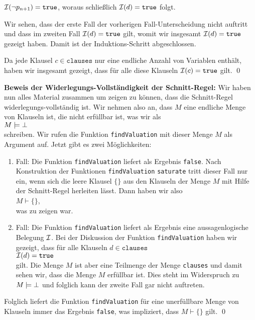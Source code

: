 \begin{enumerate}
\begin{enumerate}
\begin{enumerate}
                         $\mathcal{I}(\neg p_{n+1}) = \texttt{true}$, woraus schlie\ss{}lich $\mathcal{I}(d) = \texttt{true}$ folgt.
                   \end{enumerate}
                   Wir sehen, dass der erste Fall der vorherigen Fall-Unterscheidung nicht
                   auftritt und dass im zweiten Fall $\mathcal{I}(d) = \texttt{true}$ gilt, womit wir insgesamt 
                   $\mathcal{I}(d) = \texttt{true}$ gezeigt haben.  Damit ist der Induktions-Schritt
                   abgeschlossen.
             \end{enumerate}
             Da jede Klausel $c \in \texttt{clauses}$ nur eine endliche Anzahl von Variablen
             enth\"{a}lt, haben wir insgesamt gezeigt, dass f\"{u}r alle diese Klauseln 
             $\mathcal{I}(c) = \texttt{true}$ gilt. \qed
\end{enumerate}

\noindent
\textbf{Beweis der Widerlegungs-Vollst\"{a}ndigkeit der Schnitt-Regel:}
Wir haben nun alles Material zusammen um zeigen zu k\"{o}nnen, dass die Schnitt-Regel
widerlegungs-vollst\"{a}ndig ist.  Wir nehmen also an, dass $M$ eine endliche Menge von Klauseln ist,  die nicht
erf\"{u}llbar ist, was wir als
\\[0.2cm]
\hspace*{1.3cm}
$M \models \bot$ 
\\[0.2cm]
schreiben.  Wir rufen die Funktion \texttt{findValuation} mit dieser Menge $M$ als Argument auf.
Jetzt gibt es zwei M\"{o}glichkeiten:
\begin{enumerate}
\item Fall: Die Funktion \texttt{findValuation} liefert als Ergebnis \texttt{false}.  Nach
      Konstruktion der Funktionen \texttt{findValuation} \texttt{saturate} tritt dieser Fall nur
      ein, wenn sich die leere Klausel $\{\}$ aus den Klauseln der Menge $M$ mit Hilfe der
      Schnitt-Regel herleiten l\"{a}sst.  Dann haben wir also
      \\[0.2cm]
      \hspace*{1.3cm}
      $M \vdash \{\}$,
      \\[0.2cm]
      was zu zeigen war.
\item Fall: Die Funktion \texttt{findValuation} liefert als Ergebnis eine aussagenlogische Belegung
      $\mathcal{I}$.  Bei der Diskussion der Funktion \texttt{findValuation} haben wir gezeigt, dass f\"{u}r
      alle Klauseln $d \in \texttt{clauses}$
      \\[0.2cm]
      \hspace*{1.3cm}
      $\mathcal{I}(d) = \texttt{true}$
      \\[0.2cm]
      gilt.  Die Menge $M$ ist aber eine Teilmenge der Menge \texttt{clauses} und damit sehen wir, dass die
      Menge $M$ erf\"{u}llbar ist.  Dies steht im Widerspruch zu $M \models \bot$ und folglich kann der
      zweite Fall gar nicht auftreten. 
\end{enumerate}
Folglich liefert die Funktion \texttt{findValuation} f\"{u}r eine unerf\"{u}llbare Menge von Klauseln immer
das Ergebnis \texttt{false}, was impliziert, dass $M \vdash \{\}$ gilt.  \qed

